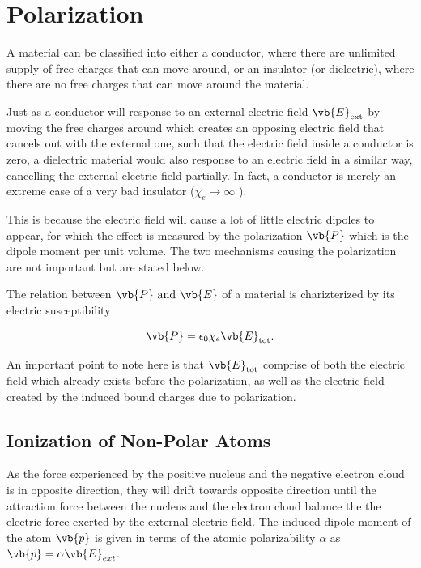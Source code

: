 \documentclass[english,a4paper,12pt]{report}
\begin{document}
\section{Polarization}

A material can be classified into either a conductor, where there are unlimited supply of free charges that can move around, or an insulator (or dielectric), where there are no free charges that can move around the material. 

Just as a conductor will response to an external electric field \(\vb{E} _{\text{ext} } \)  by moving the free charges around which creates an opposing electric field that cancels out with the external one, such that the electric field inside a conductor is zero, a dielectric material would also response to an electric field in a similar way, cancelling the external electric field partially. In fact, a conductor is merely an extreme case of a very bad insulator (\(\chi _{e} \to \infty\) ).

This is because the electric field will cause a lot of little electric dipoles to appear, for which the effect is measured by the polarization \(\vb{P} \) which is the dipole moment per unit volume. The two mechanisms causing the polarization are not important but are stated below.

The relation between \(\vb{P} \text { and } \vb{E} \) of a material is charizterized by its electric susceptibility 

\begin{equation}
    \vb{P} = \epsilon _{0} \chi _{e}\vb{E}_{\text{tot} }.
\end{equation}

An important point to note here is that \(\vb{E} _{\text{tot} } \) comprise of both the electric field which already exists before the polarization, as well as the electric field created by the induced bound charges due to polarization. 

\subsection{Ionization of Non-Polar Atoms}

As the force experienced by the positive nucleus and the negative electron cloud is in opposite direction, they will drift towards opposite direction until the attraction force between the nucleus and the electron cloud balance the the electric force exerted by the external electric field. The induced dipole moment of the atom \(\vb{p} \) is given in terms of the atomic polarizability \(\alpha \) as \(\vb{p} = \alpha \vb{E}_{ext}  \).
\end{document}

